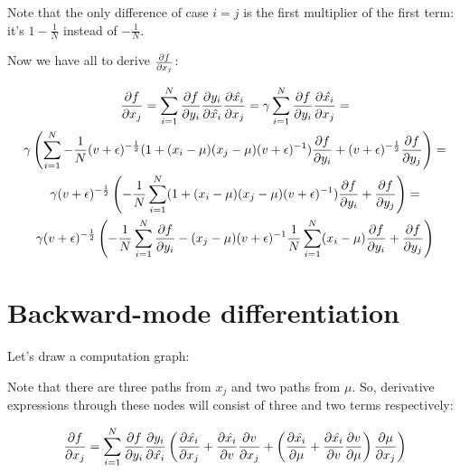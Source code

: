 \documentclass[12pt]{article}
\begin{document}
Note that the only difference of case $i = j$ is the first multiplier of the first term: it's $1 - \frac{1}{N}$ instead of $-\frac{1}{N}$.

Now we have all to derive $\pdv{f}{x_j}$:

\begin{gather*}
\pdv{f}{x_j} = 
\sum_{i=1}^{N} \pdv{f}{y_i} \pdv{y_i}{\hat{x_i}} \pdv{\hat{x_i}}{x_j} = 
\gamma \sum_{i=1}^{N} \pdv{f}{y_i} \pdv{\hat{x_i}}{x_j} = \\
\gamma \left( \sum_{i=1}^{N} -\frac{1}{N} (v + \epsilon)^{-\frac{1}{2}} (1 + (x_i - \mu) (x_j - \mu) (v + \epsilon)^{-1}) \pdv{f}{y_i} + (v + \epsilon)^{-\frac{1}{2}} \pdv{f}{y_j} \right) = \\
\gamma (v + \epsilon)^{-\frac{1}{2}} \left( -\frac{1}{N} \sum_{i=1}^{N} (1 + (x_i - \mu) (x_j - \mu) (v + \epsilon)^{-1}) \pdv{f}{y_i} + \pdv{f}{y_j} \right) = \\
\gamma (v + \epsilon)^{-\frac{1}{2}} \left( -\frac{1}{N} \sum_{i=1}^{N} \pdv{f}{y_i} - (x_j - \mu) (v + \epsilon)^{-1} \frac{1}{N} \sum_{i=1}^{N} (x_i - \mu) \pdv{f}{y_i} + \pdv{f}{y_j} \right)
\end{gather*}


\section*{Backward-mode differentiation}

Let's draw a computation graph:


Note that there are three paths from $x_j$ and two paths from $\mu$. So, derivative expressions through these nodes will consist of three and two terms respectively:

\[
	\pdv{f}{x_j} = 
	\sum_{i=1}^{N}
	\pdv{f}{y_i}
	\pdv{y_i}{\hat{x_i}} 
	\left( 
		\pdv{\hat{x_i}}{x_j} + 
		\pdv{\hat{x_i}}{v}\pdv{v}{x_j} + 
		\left( 
			\pdv{\hat{x_i}}{\mu} + 
			\pdv{\hat{x_i}}{v} \pdv{v}{\mu} 
		\right) 
		\pdv{\mu}{x_j} 
	\right) 
\]
\end{document}
